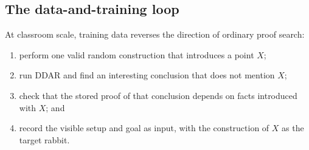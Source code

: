 \documentclass[reqno]{amsart}
\DeclareMathOperator{\1}{\textbf{1}}
\begin{document}
\subsection*{The data-and-training loop}

At classroom scale, training data reverses the direction of ordinary proof
search:
\begin{enumerate}
    \item perform one valid random construction that introduces a point $X$;
    \item run DDAR and find an interesting conclusion that does not mention
          $X$;
    \item check that the stored proof of that conclusion depends on facts
          introduced with $X$; and
    \item record the visible setup and goal as input, with the construction of
          $X$ as the target rabbit.
\end{enumerate}
\end{document}
